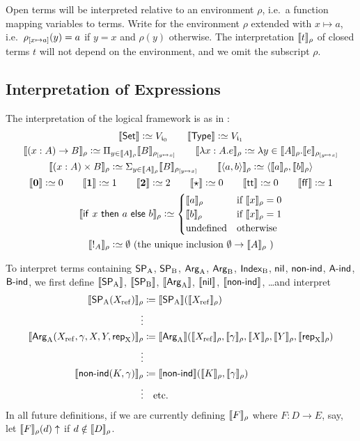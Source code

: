 \documentclass{article}
\begin{document}
Open terms will be interpreted relative to an environment $\rho$, i.e.\ a
function mapping variables to terms. Write  for the
environment $\rho$ extended with $x \mapsto a$, i.e.\ $\rhoextend{x}{a}(y) = a$
if $y = x$ and $\rho(y)$ otherwise. The interpretation $\sem{t}_{\rho}$ of closed
terms $t$ will not depend on the environment, and we omit the subscript $\rho$.

\subsection{Interpretation of Expressions}
\noindent 
The interpretation of the logical framework is as in
\cite{dybjersetzer1999finax}:
\begin{gather*}
\sem{\Set} \colonsimeq V_{\cardz} \qquad \sem{\TYPE} \colonsimeq V_{\cardi} \\
\sem{(x : A) \to B}_\rho \colonsimeq \Pi_{y \in
  \sem{A}_\rho}\sem{B}_{\rhoextend{y}{x}} \qquad
\sem{\lambda x:A.e}_\rho \colonsimeq \lambda y \in
\sem{A}_\rho.\sem{e}_{\rhoextend{y}{x}} \\
\sem{(x : A) \times B}_\rho \colonsimeq \Sigma_{y \in
  \sem{A}_\rho}\sem{B}_{\rhoextend{y}{x}} \qquad
\sem{\langle a, b \rangle}_\rho \colonsimeq \langle \sem{a}_\rho ,
\sem{b}_\rho\rangle \\
\sem{\zero} \colonsimeq 0 \qquad \sem{\one} \colonsimeq 1 \qquad
\sem{\two} \colonsimeq 2 \qquad \sem{\oneelt} \colonsimeq 0 \qquad \sem{\twott} \colonsimeq 0 \qquad
\sem{\twoff} \colonsimeq 1\\
\sem{\IF~x~\THEN~a~\ELSE~b}_\rho \colonsimeq
\begin{cases}
\sem{a}_\rho & \text{if $\sem{x}_\rho = 0$} \\
\sem{b}_\rho & \text{if $\sem{x}_\rho = 1$} \\
\text{undefined} & \text{otherwise} \\
\end{cases} \\
\sem{\magic{A}}_\rho \colonsimeq \emptyset \text{ (the unique inclusion $\emptyset \to \sem{A}_\rho$ )}
\end{gather*}

To interpret terms containing $\SPA$, $\SPB$, $\ArgA$, $\ArgB$, $\IndexB$, 
$\nilA$, $\nonindA$, $\AindA$, $\BindA$, we first define $\sem{\SPA}$,
$\sem{\SPB}$, $\sem{\ArgA}$, $\sem{\nilA}$, $\sem{\nonindA}$, \ldots and interpret
\begin{align*}
\sem{\SPA(\Xref)}_\rho &\coloneqq \sem{\SPA}(\sem{\Xref}_\rho) \\
\vdots \\
\sem{\ArgA(\Xref, \gamma, X, Y, \repA)}_\rho &\coloneqq
\sem{\ArgA}(\sem{\Xref}_\rho, \sem{\gamma}_\rho, \sem{X}_\rho, \sem{Y}_\rho, \sem{\repA}_\rho) \\
\vdots \\
\sem{\nonindA(K, \gamma)}_\rho &\coloneqq \sem{\nonindA}(\sem{K}_\rho,
\sem{\gamma}_\rho) \\
\vdots & \text{\quad etc.}
\end{align*}
In all future definitions, if we are currently defining $\sem{F}_{\rho}$ where $F : D
\to E$, say, let $\sem{F}_{\rho}(d)\uparrow$ if $d \notin \sem{D}_{\rho}$.
\end{document}
